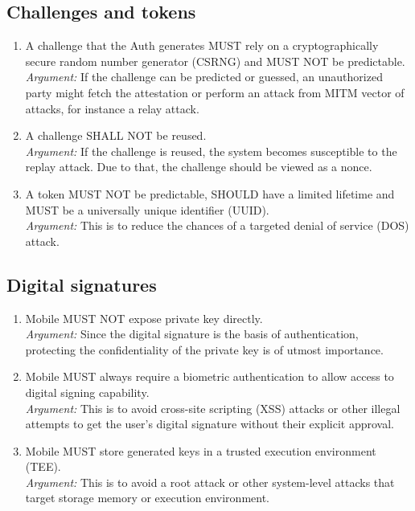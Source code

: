     \subsection{Challenges and tokens}
        \begin{enumerate}[resume]
            \item A challenge that the Auth generates MUST rely on a cryptographically secure random number 
                  generator (CSRNG) and MUST NOT be predictable.\\
            \textit{Argument:} If the challenge can be predicted or guessed, an unauthorized party might fetch the
                               attestation or perform an attack from MITM vector of attacks, for instance a relay 
                               attack.

            \item A challenge SHALL NOT be reused.\\
            \textit{Argument:} If the challenge is reused, the system becomes susceptible to the replay attack. 
                               Due to that, the challenge should be viewed as a nonce.

            \item A token MUST NOT be predictable, SHOULD have a limited lifetime and MUST be a universally unique
                  identifier (UUID).\\
            \textit{Argument:} This is to reduce the chances of a targeted denial of service (DOS) attack.
        \end{enumerate}

    \subsection{Digital signatures}
        \begin{enumerate}[resume]
            \item Mobile MUST NOT expose private key directly.\\
            \textit{Argument:} Since the digital signature is the basis of authentication, protecting the 
                               confidentiality of the private key is of utmost importance.                               

            \item Mobile MUST always require a biometric authentication to allow access to digital signing 
                  capability.\\        
            \textit{Argument:} This is to avoid cross-site scripting (XSS) attacks or other illegal attempts to 
                               get the user's digital signature without their explicit approval.

            \item Mobile MUST store generated keys in a trusted execution environment (TEE).\\        
            \textit{Argument:} This is to avoid a root attack or other system-level attacks that target storage 
                               memory or execution environment.
        \end{enumerate}

